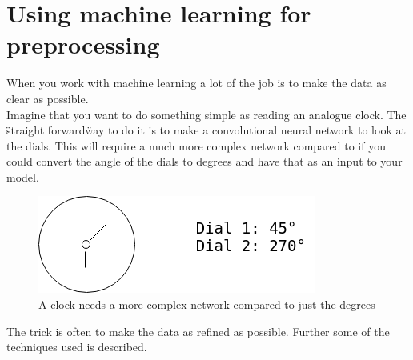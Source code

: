 \section{Using machine learning for preprocessing}
  When you work with machine learning a lot of the job is to make the data as clear as possible. \\
  Imagine that you want to do something simple as reading an analogue clock. The \"straight forward\" way to do it is to  
  make a convolutional neural network to look at the dials. This will require a much more complex network compared to if you could convert the angle of the dials
  to degrees and have that as an input to your model.

  \begin{figure}[h]
    \centering
    \includegraphics[scale=0.5]{methods/figures/Clock.png}
    \caption{A clock needs a more complex network compared to just the degrees}
  \end{figure}
  The trick is often to make the data as refined as possible. Further some of the techniques used is described.
  
  
